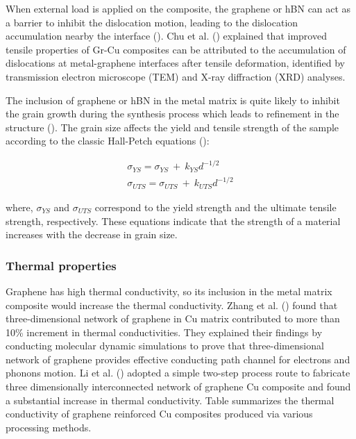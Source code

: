 When external load is applied on the composite, the graphene or hBN can act as a barrier to inhibit the dislocation motion, leading to the dislocation accumulation nearby the interface (\cite{kim2013strengthening}). Chu et al. (\cite{chu2018interface}) explained that improved tensile properties of Gr-Cu composites can be attributed to the accumulation of dislocations at metal-graphene interfaces after tensile deformation, identified by transmission electron microscope (TEM) and X-ray diffraction (XRD) analyses.

The inclusion of graphene or hBN in the metal matrix is quite likely to inhibit the grain growth during the synthesis process which leads to refinement in the structure (\cite{chu2014enhanced}). The grain size affects the yield and tensile strength of the sample according to the classic Hall-Petch equations (\cite{kato2014hall, zhang2017achieving}):

\begin{gather}
\label{eq:yield_strength}
\sigma_{YS}=\sigma_{YS}\ +\ k_{YS}d^{-1/2}
\\
\label{eq:ultimate_strength}
\sigma_{UTS}=\sigma_{UTS}\ +\ k_{UTS}d^{-1/2}
\end{gather}

where, $\sigma_{YS}$ and $\sigma_{UTS}$ correspond to the yield strength and the ultimate tensile strength, respectively. These equations indicate that the strength of a material increases with the decrease in grain size.

\subsubsection{Thermal properties}
Graphene has high thermal conductivity, so its inclusion in the metal matrix composite would increase the thermal conductivity. Zhang et al. (\cite{zhang2020powder}) found that three-dimensional network of graphene in Cu matrix contributed to more than 10\% increment in thermal conductivities. They explained their findings by conducting molecular dynamic simulations to prove that three-dimensional network of graphene provides effective conducting path channel for electrons and phonons motion. Li et al. (\cite{li2019thermal}) adopted a simple two-step process route to fabricate three dimensionally interconnected network of graphene Cu composite and found a substantial increase in thermal conductivity. Table summarizes the thermal conductivity of graphene reinforced Cu composites produced via various processing methods.

